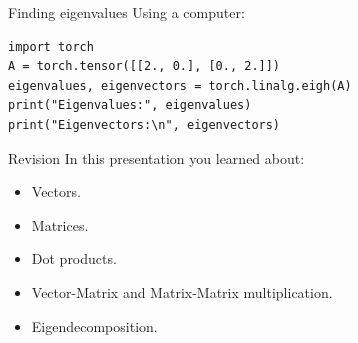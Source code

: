 \documentclass{beamer}
\begin{document}
\begin{frame}[fragile]{Finding eigenvalues}
Using a computer:
\begin{lstlisting}
import torch
A = torch.tensor([[2., 0.], [0., 2.]])
eigenvalues, eigenvectors = torch.linalg.eigh(A)
print("Eigenvalues:", eigenvalues)
print("Eigenvectors:\n", eigenvectors)
\end{lstlisting}
\end{frame}

\begin{frame}{Revision}
In this presentation you learned about:
    \begin{itemize}
        \item Vectors.
        \item Matrices.
        \item Dot products.
        \item Vector-Matrix and Matrix-Matrix multiplication.
        \item Eigendecomposition.
    \end{itemize}

\end{frame}
\end{document}
